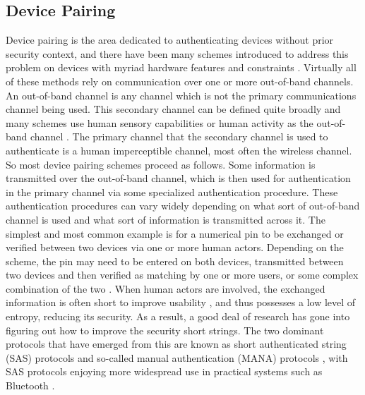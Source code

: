 \documentclass[12pt]{report}
\begin{document}
\subsection{Device Pairing}
Device pairing is the area dedicated to authenticating devices without prior security context, and there have been many schemes introduced to address this problem on devices with myriad hardware features and constraints \cite{PlayfulPairingGallego2011,BedaSoriente2007,ShakeWellBeforeUseMayrhofer2009,SeeingIsBelievingMcCune2005,TalkingToStrangersSmetters2002,LoudAndClearGoodrich2006,HapadepSoriente2008,VisualChannelPairingSaxena2006}. Virtually all of these methods rely on communication over one or more out-of-band channels. An out-of-band channel is any channel which is not the primary communications channel being used. This secondary channel can be defined quite broadly and many schemes use human sensory capabilities or human activity as the out-of-band channel \cite{SimplePairingAnalysisBluetooth4Phan2010,AliceMeetsBobKumar2009}. The primary channel that the secondary channel is used to authenticate is a human imperceptible channel, most often the wireless channel. So most device pairing schemes proceed as follows. Some information is transmitted over the out-of-band channel, which is then used for authentication in the primary channel via some specialized authentication procedure. These authentication procedures can vary widely depending on what sort of out-of-band channel is used and what sort of information is transmitted across it. The simplest and most common example is for a numerical pin to be exchanged or verified between two devices via one or more human actors. Depending on the scheme, the pin may need to be entered on both devices, transmitted between two devices and then verified as matching by one or more users, or some complex combination of the two \cite{Bluetooth40Spec2010,BluetoothInterfaceFlowSecureSimplePairing2007,JournalCompStudySecurePairingKumar2009}. When human actors are involved, the exchanged information is often short to improve usability \cite{BluetoothInterfaceFlowSecureSimplePairing2007}, and thus possesses a low level of entropy, reducing its security. As a result, a good deal of research has gone into figuring out how to improve the security short strings. The two dominant protocols that have emerged from this are known as short authenticated string (SAS) protocols \cite{SASVaudenay2005} and so-called manual authentication (MANA) protocols \cite{ManaGehrmann2004}, with SAS protocols enjoying more widespread use in practical systems such as Bluetooth \cite{Bluetooth40Spec2010}. \par
\end{document}
